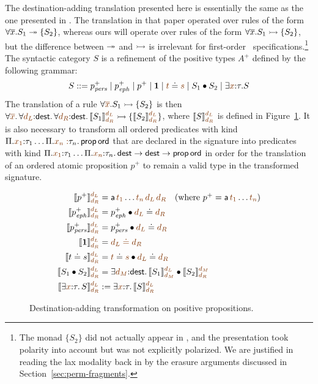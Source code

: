 The destination-adding translation presented here is essentially the
same as the one presented in \cite{simmons11logical}. The translation
in that paper operated over rules of the form $\forall
\overline{x}. S_1 \twoheadrightarrow \{ S_2 \}$, whereas ours will operate over
rules of the form $\forall \overline{x}. S_1 \rightarrowtail \{ S_2 \}$, but
the difference between $\twoheadrightarrow$ and $\rightarrowtail$ is irrelevant for
first-order \sls~specifications.\footnote{The monad $\{ S_2 \}$ did
  not actually appear in \cite{simmons11logical}, and the presentation
  took polarity into account but was not explicitly polarized. We are
  justified in reading the lax modality back in by the erasure
  arguments discussed in Section~\ref{sec:perm-fragments}.} The
syntactic category $S$ is a refinement of the positive types $A^+$
defined by the following grammar:
\[
S ::= p^+_\mpers \mid p^+_\meph \mid p^+ \mid \one
\mid \lf{t} \doteq \lf{s} \mid S_1 \fuse S_2 \mid \exists \lf{x}{:}\tau. S
\]
The translation of a rule $\forall \lf{\overline{x}}. S_1 \lefti \{ S_2 \}$
is then $\forall \lf{\overline{x}}.\, \forall \lf{d_L}{:}{\sf dest}.\, \forall
\lf{d_R}{:}{\sf dest}.\, \llbracket S_1 \rrbracket^{\lf{d_L}}_{\lf{d_R}} \lefti \{
\llbracket S_2 \rrbracket^{\lf{d_L}}_{\lf{d_R}} \}$, where $\llbracket S
\rrbracket^{\lf{d_L}}_{\lf{d_R}}$ is defined in Figure~\ref{fig:destadd-pos}. It
is also necessary to transform all ordered predicates with kind
$\Pi. \lf{x_1}{:}\tau_1\ldots \Pi.\lf{x_n{}:}\tau_n.\,{\sf prop\,ord}$ that are
declared in the signature into predicates with kind
$\Pi. \lf{x_1}{:}\tau_1\ldots \Pi.\lf{x_n}{:}\tau_n.\, {\sf dest} \rightarrow
{\sf dest} \rightarrow {\sf prop\,ord}$ in order for the translation
of an ordered atomic proposition $p^+$ to remain a valid type in
the transformed signature.

\begin{figure}
\begin{align*}
\llbracket p^+ \rrbracket^{\lf{d_L}}_{\lf{d_R}} & = 
 {\sf a}\,\lf{t_1}\ldots \lf{t_n}\,\lf{d_L}\,\lf{d_R} ~~~ \mbox{(where $p^+ = {\sf a}\,\lf{t_1}\ldots \lf{t_n}$)}
\\
\llbracket p^+_\meph \rrbracket^{\lf{d_L}}_{\lf{d_R}} & = p^+_\meph \fuse \lf{d_L} \doteq \lf{d_R}
\\
\llbracket p^+_\mpers \rrbracket^{\lf{d_L}}_{\lf{d_R}} & = p^+_\mpers \fuse \lf{d_L} \doteq \lf{d_R}
\\
\llbracket \one \rrbracket^{\lf{d_L}}_{\lf{d_R}} & = \lf{d_L \doteq d_R}
\\
\llbracket t \doteq s \rrbracket^{\lf{d_L}}_{\lf{d_R}} & = \lf{t} \doteq \lf{s} \fuse \lf{d_L} \doteq \lf{d_R}
\\
\llbracket S_1 \fuse S_2 \rrbracket^{\lf{d_L}}_{\lf{d_R}} & = 
 \exists \lf{d_M}{:}{\sf dest}.\, 
   \llbracket S_1 \rrbracket^{\lf{d_L}}_{\lf{d_M}}
   \fuse
   \llbracket S_2 \rrbracket^{\lf{d_M}}_{\lf{d_R}}
\\
\llbracket \exists \lf{x}{:}\tau.\,S \rrbracket^{\lf{d_L}}_{\lf{d_R}} & := 
 \exists \lf{x}{:}\tau.\, \llbracket S \rrbracket^{\lf{d_L}}_{\lf{d_R}}
\end{align*}
\caption{Destination-adding transformation on positive propositions.}
\label{fig:destadd-pos}
\end{figure}

